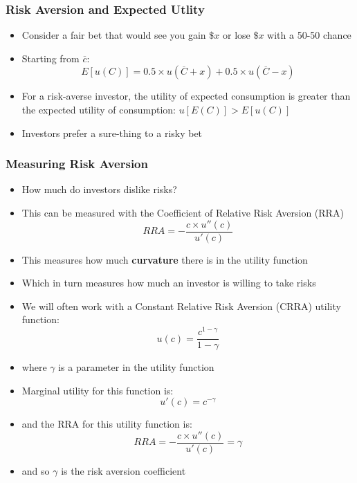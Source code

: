\documentclass[a4paper]{article}
\begin{document}
\subsubsection{Risk Aversion and Expected Utlity}
	\begin{itemize}
		\item Consider a fair bet that would see you gain \( \$x \) or lose \( \$x \) with a 50-50 chance
		\item Starting from \( \overline{c} \):
		\[
			E[u(C)] = 0.5 \times u(\overline{C}+x) + 0.5 \times u(\overline{C}-x)
		\]
		\item For a risk-averse investor, the utility of expected consumption is greater than the expected utility of consumption: \( u[E(C)] > E[u(C)] \)
		\item \textcolor{myblue}{Investors prefer a sure-thing to a risky bet}
	\end{itemize}
\subsubsection{Measuring Risk Aversion}
	\begin{itemize}
		\item How much do investors dislike risks?
		\item This can be measured with the \textcolor{myblue}{Coefficient of Relative Risk Aversion} (RRA)
		\[
			RRA = -\frac{c \times u''(c)}{u'(c)}
		\]
		\item This measures how much \textbf{curvature} there is in the utility function
		\item Which in turn measures how much an investor is willing to take risks
		\item We will often work with a \textcolor{myblue}{Constant Relative Risk Aversion} (CRRA) utility function:
		\[
			u(c) = \frac{c^{1-\gamma}}{1-\gamma}
		\]
		\item where \( \gamma \) is a parameter in the utility function
		\item Marginal utility for this function is:
		\[
			u'(c)=c^{-\gamma}
		\]
		\item and the RRA for this utility function is:
		\[
			RRA = -\frac{c \times u''(c)}{u'(c)} = \gamma
		\]
		\item and so \( \gamma \) is the risk aversion coefficient
	\end{itemize}
\end{document}
